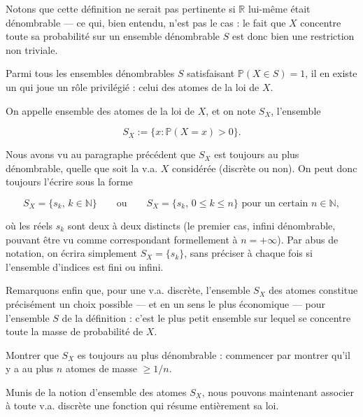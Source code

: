 Notons que cette définition ne serait pas pertinente si $\mathbb{R}$ lui-même était dénombrable — ce qui, bien entendu, n'est pas le cas : le fait que $X$ concentre toute sa probabilité sur un ensemble dénombrable $S$ est donc bien une restriction non triviale.

Parmi tous les ensembles dénombrables $S$ satisfaisant $\mathbb{P}(X \in S) = 1$, il en existe un qui joue un rôle privilégié : celui des atomes de la loi de $X$.

\medskip

\begin{mdframed}
\begin{definition}
On appelle ensemble des atomes de la loi de $X$, et on note $S_X$, l'ensemble

$$
S_X := \{x : \mathbb{P}(X = x) > 0\}.
$$
\end{definition}
\end{mdframed}

Nous avons vu au paragraphe précédent que $S_X$ est toujours au plus dénombrable, quelle que soit la v.a. $X$ considérée (discrète ou non). On peut donc toujours l'écrire sous la forme

$$
S_X = \{s_k, \, k \in \mathbb{N}\} \qquad \text{ou} \qquad S_X = \{s_k, \, 0 \leq k \leq n\} \text{ pour un certain } n \in \mathbb{N},
$$

où les réels $s_k$ sont deux à deux distincts (le premier cas, infini dénombrable, pouvant être vu comme correspondant formellement à $n = +\infty$). Par abus de notation, on écrira simplement $S_X = \{s_k\}$, sans préciser à chaque fois si l'ensemble d'indices est fini ou infini.

Remarquons enfin que, pour une v.a. discrète, l'ensemble $S_X$ des atomes constitue précisément un choix possible — et en un sens le plus économique — pour l'ensemble $S$ de la définition : c'est le plus petit ensemble sur lequel se concentre toute la masse de probabilité de $X$.

\begin{exercice}
Montrer que $S_X$ es toujours au plus dénombrable : commencer par montrer qu'il y a au plus $n$ atomes de masse $\geq 1/n$.
\end{exercice}

\newpage

Munis de la notion d'ensemble des atomes $S_X$, nous pouvons maintenant associer à toute v.a. discrète une fonction qui résume entièrement sa loi.

\medskip

